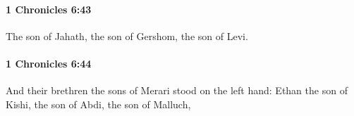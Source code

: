 		\paragraph{1 Chronicles 6:43} %
			\label{1CHRONICLES-6-43}

			The son of Jahath, the son of Gershom, the son of Levi.


		\paragraph{1 Chronicles 6:44} %
			\label{1CHRONICLES-6-44}

			And their brethren the sons of Merari stood on the left hand: Ethan the son of Kishi, the son of Abdi, the son of Malluch,


